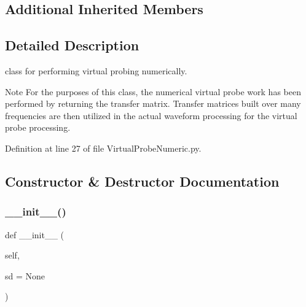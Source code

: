 \subsection*{Additional Inherited Members}


\subsection{Detailed Description}
class for performing virtual probing numerically. 

\begin{DoxyNote}{Note}
For the purposes of this class, the numerical virtual probe work has been performed by returning the transfer matrix. Transfer matrices built over many frequencies are then utilized in the actual waveform processing for the virtual probe processing. 
\end{DoxyNote}


Definition at line 27 of file Virtual\+Probe\+Numeric.\+py.



\subsection{Constructor \& Destructor Documentation}
\mbox{\label{classSignalIntegrity_1_1SystemDescriptions_1_1VirtualProbeNumeric_1_1VirtualProbeNumeric_a2fa2ae61a4511a760e2d2047ec07eb05}} 
\subsubsection{\texorpdfstring{\+\_\+\+\_\+init\+\_\+\+\_\+()}{\_\_init\_\_()}}
{\footnotesize\ttfamily def \+\_\+\+\_\+init\+\_\+\+\_\+ (\begin{DoxyParamCaption}\item[{}]{self,  }\item[{}]{sd = {\ttfamily None} }\end{DoxyParamCaption})}



